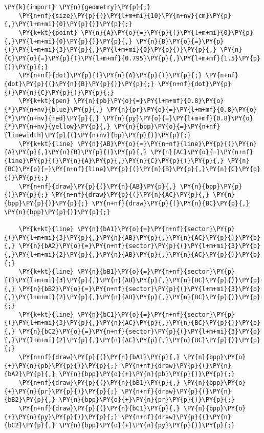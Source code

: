 \begin{Verbatim}[commandchars=\\\{\}]
    \PY{k}{import} \PY{n}{geometry}\PY{p}{;}
    \PY{n+nf}{size}\PY{p}{(}\PY{l+m+mi}{10}\PY{n+nv}{cm}\PY{p}{,}\PY{l+m+mi}{0}\PY{p}{)}\PY{p}{;}
    \PY{k+kt}{point} \PY{n}{A}\PY{o}{=}\PY{p}{(}\PY{l+m+mi}{0}\PY{p}{,}\PY{l+m+mi}{0}\PY{p}{)}\PY{p}{,} \PY{n}{B}\PY{o}{=}\PY{p}{(}\PY{l+m+mi}{3}\PY{p}{,}\PY{l+m+mi}{0}\PY{p}{)}\PY{p}{,} \PY{n}{C}\PY{o}{=}\PY{p}{(}\PY{l+m+mf}{0.795}\PY{p}{,}\PY{l+m+mf}{1.5}\PY{p}{)}\PY{p}{;}
    \PY{n+nf}{dot}\PY{p}{(}\PY{n}{A}\PY{p}{)}\PY{p}{;} \PY{n+nf}{dot}\PY{p}{(}\PY{n}{B}\PY{p}{)}\PY{p}{;} \PY{n+nf}{dot}\PY{p}{(}\PY{n}{C}\PY{p}{)}\PY{p}{;}
    \PY{k+kt}{pen} \PY{n}{pb}\PY{o}{=}\PY{l+m+mf}{0.8}\PY{o}{*}\PY{n+nv}{blue}\PY{p}{,} \PY{n}{pr}\PY{o}{=}\PY{l+m+mf}{0.8}\PY{o}{*}\PY{n+nv}{red}\PY{p}{,} \PY{n}{py}\PY{o}{=}\PY{l+m+mf}{0.8}\PY{o}{*}\PY{n+nv}{yellow}\PY{p}{,} \PY{n}{bpp}\PY{o}{=}\PY{n+nf}{linewidth}\PY{p}{(}\PY{n+nv}{bp}\PY{p}{)}\PY{p}{;}
    \PY{k+kt}{line} \PY{n}{AB}\PY{o}{=}\PY{n+nf}{line}\PY{p}{(}\PY{n}{A}\PY{p}{,}\PY{n}{B}\PY{p}{)}\PY{p}{,} \PY{n}{AC}\PY{o}{=}\PY{n+nf}{line}\PY{p}{(}\PY{n}{A}\PY{p}{,}\PY{n}{C}\PY{p}{)}\PY{p}{,} \PY{n}{BC}\PY{o}{=}\PY{n+nf}{line}\PY{p}{(}\PY{n}{B}\PY{p}{,}\PY{n}{C}\PY{p}{)}\PY{p}{;}
    \PY{n+nf}{draw}\PY{p}{(}\PY{n}{AB}\PY{p}{,} \PY{n}{bpp}\PY{p}{)}\PY{p}{;} \PY{n+nf}{draw}\PY{p}{(}\PY{n}{AC}\PY{p}{,} \PY{n}{bpp}\PY{p}{)}\PY{p}{;} \PY{n+nf}{draw}\PY{p}{(}\PY{n}{BC}\PY{p}{,} \PY{n}{bpp}\PY{p}{)}\PY{p}{;}

    \PY{k+kt}{line} \PY{n}{bA1}\PY{o}{=}\PY{n+nf}{sector}\PY{p}{(}\PY{l+m+mi}{3}\PY{p}{,}\PY{n}{AB}\PY{p}{,}\PY{n}{AC}\PY{p}{)}\PY{p}{,} \PY{n}{bA2}\PY{o}{=}\PY{n+nf}{sector}\PY{p}{(}\PY{l+m+mi}{3}\PY{p}{,}\PY{l+m+mi}{2}\PY{p}{,}\PY{n}{AB}\PY{p}{,}\PY{n}{AC}\PY{p}{)}\PY{p}{;}
    \PY{k+kt}{line} \PY{n}{bB1}\PY{o}{=}\PY{n+nf}{sector}\PY{p}{(}\PY{l+m+mi}{3}\PY{p}{,}\PY{n}{AB}\PY{p}{,}\PY{n}{BC}\PY{p}{)}\PY{p}{,} \PY{n}{bB2}\PY{o}{=}\PY{n+nf}{sector}\PY{p}{(}\PY{l+m+mi}{3}\PY{p}{,}\PY{l+m+mi}{2}\PY{p}{,}\PY{n}{AB}\PY{p}{,}\PY{n}{BC}\PY{p}{)}\PY{p}{;}
    \PY{k+kt}{line} \PY{n}{bC1}\PY{o}{=}\PY{n+nf}{sector}\PY{p}{(}\PY{l+m+mi}{3}\PY{p}{,}\PY{n}{AC}\PY{p}{,}\PY{n}{BC}\PY{p}{)}\PY{p}{,} \PY{n}{bC2}\PY{o}{=}\PY{n+nf}{sector}\PY{p}{(}\PY{l+m+mi}{3}\PY{p}{,}\PY{l+m+mi}{2}\PY{p}{,}\PY{n}{AC}\PY{p}{,}\PY{n}{BC}\PY{p}{)}\PY{p}{;}
    \PY{n+nf}{draw}\PY{p}{(}\PY{n}{bA1}\PY{p}{,} \PY{n}{bpp}\PY{o}{+}\PY{n}{pb}\PY{p}{)}\PY{p}{;} \PY{n+nf}{draw}\PY{p}{(}\PY{n}{bA2}\PY{p}{,} \PY{n}{bpp}\PY{o}{+}\PY{n}{pb}\PY{p}{)}\PY{p}{;}
    \PY{n+nf}{draw}\PY{p}{(}\PY{n}{bB1}\PY{p}{,} \PY{n}{bpp}\PY{o}{+}\PY{n}{pr}\PY{p}{)}\PY{p}{;} \PY{n+nf}{draw}\PY{p}{(}\PY{n}{bB2}\PY{p}{,} \PY{n}{bpp}\PY{o}{+}\PY{n}{pr}\PY{p}{)}\PY{p}{;}
    \PY{n+nf}{draw}\PY{p}{(}\PY{n}{bC1}\PY{p}{,} \PY{n}{bpp}\PY{o}{+}\PY{n}{py}\PY{p}{)}\PY{p}{;} \PY{n+nf}{draw}\PY{p}{(}\PY{n}{bC2}\PY{p}{,} \PY{n}{bpp}\PY{o}{+}\PY{n}{py}\PY{p}{)}\PY{p}{;}


\end{Verbatim}
